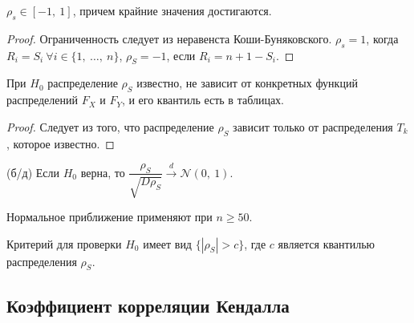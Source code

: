 \begin{proposition}
    $\displaystyle \rho _{s} \in [ -1,\ 1]$, причем крайние значения достигаются.
\end{proposition}
\begin{proof}
    Ограниченность следует из неравенста Коши-Буняковского. $\displaystyle \rho _{s} =1$, когда $\displaystyle R_{i} =S_{i} \ \forall i\in \{1,\ \dotsc ,\ n\}$, $\displaystyle \rho _{S} =-1$, если $\displaystyle R_{i} =n+1-S_{i}$.
\end{proof}
\begin{proposition}
    При $\displaystyle H_{0}$ распределение $\displaystyle \rho_{S}$ известно, не зависит от конкретных функций распределений $\displaystyle F_{X}$ и $\displaystyle F_{Y}$, и его квантиль есть в таблицах.
\end{proposition}
\begin{proof}
    Следует из того, что распределение $\displaystyle \rho _{S}$ зависит только от распределения $\displaystyle T_{k}$, которое известно.
\end{proof}
\begin{proposition}
    (б/д) Если $\displaystyle H_{0}$ верна, то $\displaystyle \dfrac{\rho _{S}}{\sqrt{D\rho _{S}}}\xrightarrow{d}\mathcal{N}( 0,\ 1)$.
\end{proposition}
\begin{note}
    Нормальное приближение применяют при $\displaystyle n\geqslant 50$.
\end{note}
Критерий для проверки $\displaystyle H_{0}$ имеет вид $\displaystyle \{| \rho _{S}|  >c\}$, где $\displaystyle c$ является квантилью распределения $\displaystyle \rho _{S}$.
\subsection{Коэффициент корреляции Кендалла}

